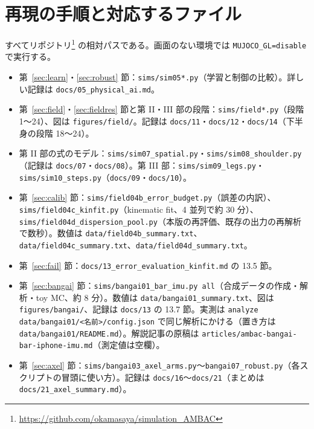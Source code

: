 \documentclass[paper=a4paper,fontsize=10pt,twocolumn,column_gap=2zw,line_length=24zw,number_of_lines=46,head_space=20mm]{jlreq}
\newcommand{\repo}{https://github.com/okamasaya/simulation_AMBAC}
\begin{document}
\section{再現の手順と対応するファイル}
\small
すべてリポジトリ\footnote{\url{\repo}} の相対パスである。画面のない環境では \texttt{MUJOCO\_GL=disable} で実行する。
\begin{itemize}\setlength{\itemsep}{0pt}
\item 第~\ref{sec:learn}・\ref{sec:robust} 節：\texttt{sims/sim05*.py}（学習と制御の比較）。詳しい記録は \texttt{docs/05\_physical\_ai.md}。
\item 第~\ref{sec:field}・\ref{sec:fieldres} 節と第 II・III 部の段階：\texttt{sims/field*.py}（段階 1〜24）、図は \texttt{figures/field/}。記録は \texttt{docs/11}・\texttt{docs/12}・\texttt{docs/14}（下半身の段階 18〜24）。
\item 第 II 部の式のモデル：\texttt{sims/sim07\_spatial.py}・\texttt{sims/sim08\_shoulder.py}（記録は \texttt{docs/07}・\texttt{docs/08}）。第 III 部：\texttt{sims/sim09\_legs.py}・\texttt{sims/sim10\_steps.py}（\texttt{docs/09}・\texttt{docs/10}）。
\item 第~\ref{sec:calib} 節：\texttt{sims/field04b\_error\_budget.py}（誤差の内訳）、\texttt{sims/field04c\_kinfit.py}（kinematic fit、4 並列で約 30 分）、
\texttt{sims/field04d\_dispersion\_pool.py}（本版の再評価、既存の出力の再解析で数秒）。数値は \texttt{data/field04b\_summary.txt}、\texttt{data/field04c\_summary.txt}、\texttt{data/field04d\_summary.txt}。
\item 第~\ref{sec:fail} 節：\texttt{docs/13\_error\_evaluation\_kinfit.md} の 13.5 節。
\item 第~\ref{sec:bangai} 節：\texttt{sims/bangai01\_bar\_imu.py all}（合成データの作成・解析・toy MC、約 8 分）。数値は \texttt{data/bangai01\_summary.txt}、図は \texttt{figures/bangai/}、記録は \texttt{docs/13} の 13.7 節。実測は \texttt{analyze data/bangai01/<名前>/config.json} で同じ解析にかける（置き方は \texttt{data/bangai01/README.md}）。解説記事の原稿は \texttt{articles/ambac-bangai-bar-iphone-imu.md}（測定値は空欄）。
\item 第~\ref{sec:axel} 節：\texttt{sims/bangai03\_axel\_arms.py}〜\texttt{bangai07\_robust.py}（各スクリプトの冒頭に使い方）。記録は \texttt{docs/16}〜\texttt{docs/21}（まとめは \texttt{docs/21\_axel\_summary.md}）。
\end{itemize}
\end{document}
